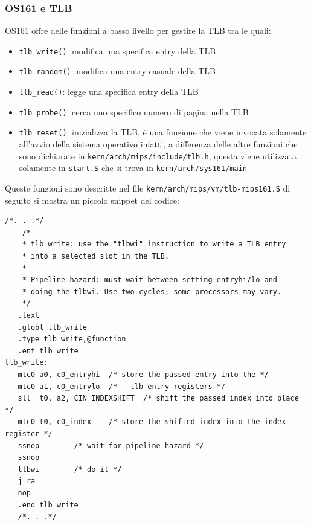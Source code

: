 \subsubsection{OS161 e TLB}
OS161 offre delle funzioni a basso livello per gestire la TLB tra le quali:
\begin{itemize}
    \item \lstinline{tlb_write()}: modifica una specifica entry della TLB
    \item \lstinline{tlb_random()}: modifica una entry casuale della TLB
    \item \lstinline{tlb_read()}: legge una specifica entry della TLB
    \item \lstinline{tlb_probe()}: cerca uno specifico numero di pagina nella TLB
    \item \lstinline{tlb_reset()}: inizializza la TLB, è una funzione che viene invocata solamente all'avvio della sistema operativo infatti, a differenza delle altre funzioni che sono dichiarate in \lstinline{kern/arch/mips/include/tlb.h}, questa viene utilizzata solamente in \lstinline{start.S} che si trova in \lstinline{kern/arch/sys161/main}
\end{itemize}
Queste funzioni sono descritte nel file \lstinline{kern/arch/mips/vm/tlb-mips161.S} di seguito si mostra un piccolo snippet del codice:
\begin{lstlisting}[caption=Parte del file \lstinline{tlb-mips161.S} nella quale sono descritte le funzioni per gestire la TLB]
    /*. . .*/
    /*
    * tlb_write: use the "tlbwi" instruction to write a TLB entry
    * into a selected slot in the TLB.
    *
    * Pipeline hazard: must wait between setting entryhi/lo and
    * doing the tlbwi. Use two cycles; some processors may vary.
    */
   .text
   .globl tlb_write
   .type tlb_write,@function
   .ent tlb_write
tlb_write:
   mtc0 a0, c0_entryhi	/* store the passed entry into the */
   mtc0 a1, c0_entrylo	/*   tlb entry registers */
   sll  t0, a2, CIN_INDEXSHIFT  /* shift the passed index into place */
   mtc0 t0, c0_index	/* store the shifted index into the index register */
   ssnop		/* wait for pipeline hazard */
   ssnop
   tlbwi		/* do it */
   j ra
   nop
   .end tlb_write
   /*. . .*/
\end{lstlisting}

